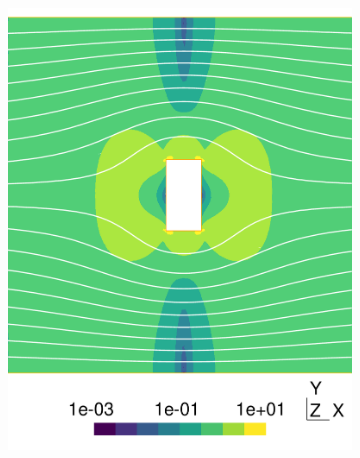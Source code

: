 \documentclass[11 pt]{report}
\begin{document}
\begin{figure}
    \centering
    \begin{subfigure}[t]{0.495\textwidth}
        \includegraphics[width=\textwidth]{../figures/cylinder_0.pdf}
        \label{fig:cylinder0}
    \end{subfigure}
    \begin{subfigure}[t]{0.495\textwidth}

\end{subfigure}
\end{figure}
\end{document}
